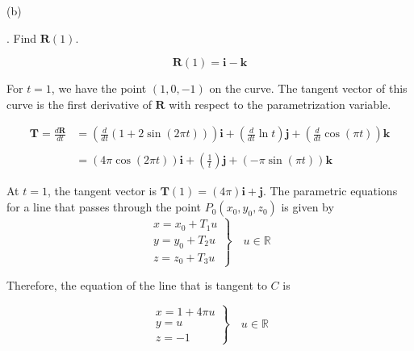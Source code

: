 \documentclass{article}
\begin{document}
\hfill

\noindent (b)
\begin{center}
\end{center}

\newpage

. Find $\mathbf{R}(1)$.

\[\mathbf{R}(1)=\mathbf{i}-\mathbf{k}\]

\hfill

\noindent For $t=1$, we have the point $(1,0,-1)$ on the curve. The tangent vector of this curve is the first derivative of $\mathbf{R}$ with respect to the parametrization variable.

\begin{align*}\mathbf{T}=\frac{d\mathbf R}{dt}&=\left(\frac d{dt}\left(1+2\sin(2\pi t)\right)\right)\mathbf{i}+\left(\frac d{dt}\ln t\right)\mathbf{j}+\left(\frac d{dt}\cos(\pi t)\right)\mathbf{k}\\\\&=(4\pi\cos(2\pi t))\mathbf{i}+\left(\frac1t\right)\mathbf{j}+(-\pi\sin(\pi t))\mathbf{k}\end{align*}

\hfill

\noindent At $t=1$, the tangent vector is $\mathbf{T}(1)=\left(4\pi\right)\mathbf{i}+\mathbf{j}$. The parametric equations for a line that passes through the point $P_0(x_0,y_0,z_0)$ is given by
\[\left.\begin{array}{c}
x=x_0+T_1u\\
y=y_0+T_2u\\
z=z_0+T_3u
\end{array}\right\}\quad u\in\mathbb{R}\]

\hfill

\noindent Therefore, the equation of the line that is tangent to $C$ is

\[\boxed{\left.\begin{array}{l}
x=1+4\pi u\\
y=u\\
z=-1
\end{array}\right\}\quad u\in\mathbb{R}}\]
\end{document}

